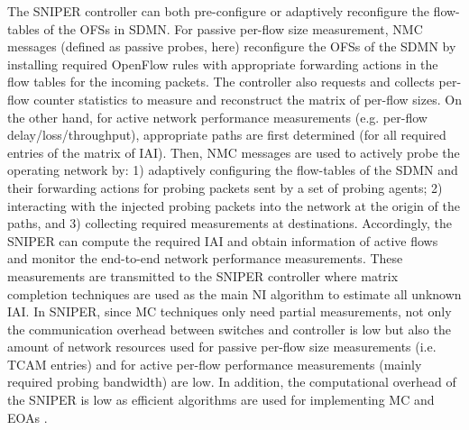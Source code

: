 The SNIPER controller can both pre-configure or adaptively reconfigure the
flow-tables of the OFSs in SDMN. For passive per-flow size
measurement, NMC messages (defined as passive probes, here)
reconfigure the OFSs of the SDMN by installing required OpenFlow rules
with appropriate forwarding actions in the flow tables for the
incoming packets. The controller also requests and collects per-flow
counter statistics to measure and reconstruct the matrix of per-flow
sizes. On the other hand, for active network performance measurements
(e.g. per-flow delay/loss/throughput), appropriate paths are first
determined (for all required entries of the matrix of IAI). Then, NMC
messages are used to actively probe the operating network by: 1)
adaptively configuring the flow-tables of the SDMN and their
forwarding actions for probing packets sent by a set of probing agents; 2)
interacting with the injected probing packets into the network at the
origin of the paths, and 3) collecting required measurements at
destinations. Accordingly, the SNIPER can compute the required IAI and
obtain information of active flows and monitor the end-to-end network
performance measurements. These measurements are transmitted to the
SNIPER controller where matrix completion techniques are used as the
main NI algorithm to estimate all unknown IAI. In SNIPER, since MC
techniques only need partial measurements, not only the communication
overhead between switches and controller is low but also the amount of
network resources used for passive per-flow size measurements
(i.e. TCAM entries) and for active per-flow performance measurements
(mainly required probing bandwidth) are low. In addition, the computational overhead of the SNIPER is low as efficient algorithms are used for implementing MC and EOAs \cite{Roughan:2012}\cite{YLiao:2011}\cite{Kachitvichyanuku:2012}. 

